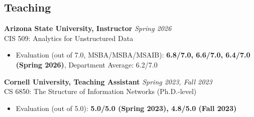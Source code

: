 \documentclass[margin]{res}
\newcommand{\field}[2]{\noindent \textbf{#1} \hfill #2 \\}
\newcommand{\specialurl}[2]{\href {#2} {\mbox{{\texttt{[#1]}}}}\hspace{0pt}}
\newcommand{\code}[1]{\specialurl {code} {#1}}
\newcommand{\data}[1]{\specialurl {data} {#1}}
\newcommand{\talk}[1]{\specialurl {talk} {#1}}
\begin{document}
\begin{resume}
%
%
%
%
%
%
%
%
%
%

\section{Teaching}

\field{Arizona State University, Instructor} {\emph{Spring 2026}}
CIS 509: Analytics for Unstructured Data
\vspace{-1.5em}
\begin{itemize}
	\item [--] Evaluation (out of 7.0, MSBA/MSBA/MSAIB): \textbf{6.8/7.0, 6.6/7.0, 6.4/7.0 (Spring 2026)}, Department Average: 6.2/7.0
\end{itemize}

\field{Cornell University, Teaching Assistant} {\emph{Spring 2023, Fall 2023}}
CS 6850: The Structure of Information Networks (Ph.D.-level)
\vspace{-1.5em}
\begin{itemize}
	\item [--] {Evaluation (out of 5.0):} \textbf{5.0/5.0 (Spring 2023), 4.8/5.0 (Fall 2023)}
\end{itemize}




\end{resume}
\end{document}
